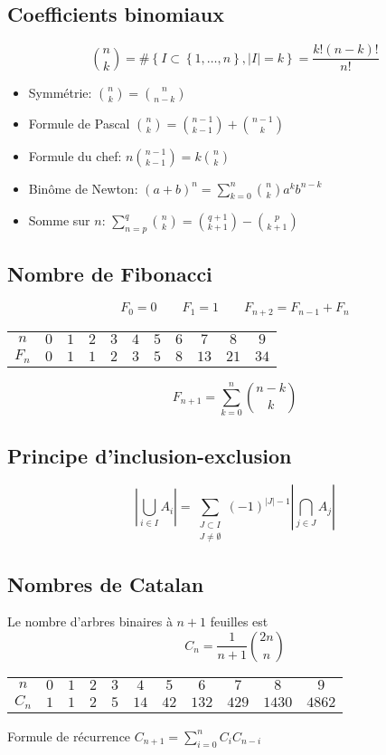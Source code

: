 \documentclass[10pt,twocolumn]{article}
\newcommand{\abs}[1]{\left\lvert{ #1 }\right\rvert}
\newcommand{\set}[1]{\left\lbrace #1 \right\rbrace}
\begin{document}
\subsection{Coefficients binomiaux}
$$
    \binom n k = \#\set{I \subset \set{1, \dots, n}, \abs I = k} = \frac{k!(n-k)!}{n!}
$$
\begin{itemize}
    \item Symm\'etrie: $\binom{n}{k} = \binom{n}{n - k}$
    \item Formule de Pascal $\binom n k = \binom{n - 1}{k - 1} + \binom{n - 1}{k}$
    \item Formule du chef: $n\binom{n - 1}{k - 1} = k\binom{n}{k}$
    \item Binôme de Newton: $(a + b)^n = \sum_{k = 0}^n \binom n k a^k b^{n - k}$
    \item Somme sur $n$: $\sum_{n = p}^q \binom n k = \binom{q + 1}{k + 1} - \binom{p}{k + 1}$
\end{itemize}

\subsection{Nombre de Fibonacci}
$$
    F_0 = 0 \qquad F_1 = 1 \qquad F_{n + 2} = F_{n - 1} + F_n
$$
\begin{center}
\begin{tabular}{c|cccccccccc}
    $n$ & $0$ & $1$ & $2$ & $3$ & $4$ & $5$ & $6$ & $7$ & $8$ & $9$ \\
    $F_n$ & $0$ & $1$ & $1$ & $2$ & $3$ & $5$ & $8$ & $13$ & $21$ & $34$
\end{tabular}
\end{center}
$$
    F_{n + 1} = \sum_{k = 0}^n \binom{n - k} k
$$

\subsection{Principe d'inclusion-exclusion}
$$
    \abs{\bigcup_{i \in I} A_i} = \sum_{\substack{J \subset I \\ J \neq \emptyset}} (-1)^{\abs J - 1} \abs{\bigcap_{j \in J} A_j}
$$

\subsection{Nombres de Catalan}
Le nombre d'arbres binaires à $n+1$ feuilles est
$$
    C_n = \frac 1 {n + 1}\binom{2n} n
$$
\begin{center}
\begin{tabular}{c|cccccccccc}
    $n$ & $0$ & $1$ & $2$ & $3$ & $4$ & $5$ & $6$ & $7$ & $8$ & $9$ \\
    $C_n$ & $1$ & $1$ & $2$ & $5$ & $14$ & $42$ & $132$ & $429$ & $1430$ & $4862$
\end{tabular}
\end{center}
Formule de récurrence $C_{n + 1} = \sum_{i = 0}^n C_i C_{n-i}$
\end{document}
